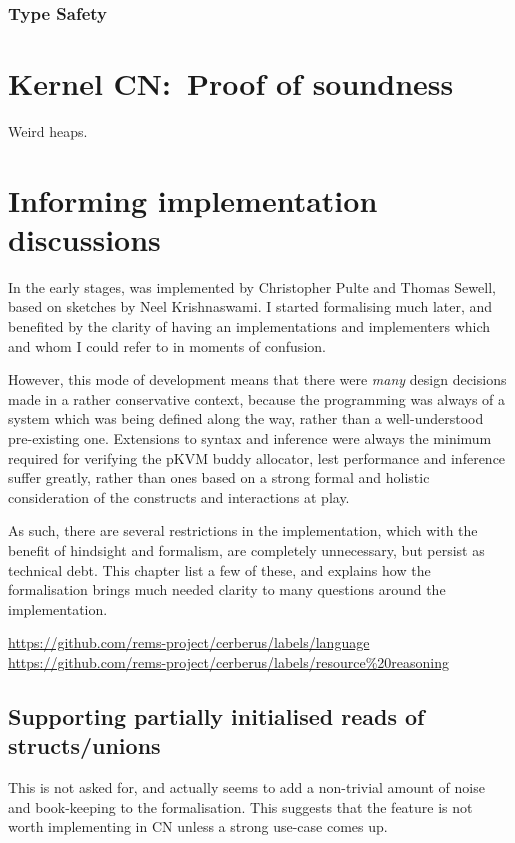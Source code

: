\subsection{Type Safety}


\chapter{Kernel CN:\ Proof of soundness}%
\label{chap:kernel-soundness}

Weird heaps.

\chapter{Informing implementation discussions}\label{chap:inform-impl}

In the early stages,  was implemented by Christopher Pulte and Thomas
Sewell, based on sketches by Neel Krishnaswami. I started formalising
 much later, and benefited by the clarity of having an
implementations and implementers which and whom I could refer to in moments of
confusion.

However, this mode of development means that there were \emph{many} design
decisions made in a rather conservative context, because the programming was
always of a system which was being defined along the way, rather than a
well-understood pre-existing one. Extensions to syntax and inference were
always the minimum required for verifying the pKVM buddy allocator, lest
performance and inference suffer greatly, rather than ones based on a strong
formal and holistic consideration of the constructs and interactions at play.

As such, there are several restrictions in the implementation, which with the
benefit of hindsight and formalism, are completely unnecessary, but persist as
technical debt. This chapter list a few of these, and explains how the
formalisation brings much needed clarity to many questions around the
implementation.

\url{https://github.com/rems-project/cerberus/labels/language}
\url{https://github.com/rems-project/cerberus/labels/resource\%20reasoning}

\section{Supporting partially initialised reads of structs/unions}

This is not asked for, and actually seems to add a non-trivial amount of noise
and book-keeping to the formalisation. This suggests that the feature is not
worth implementing in CN unless a strong use-case comes up.

